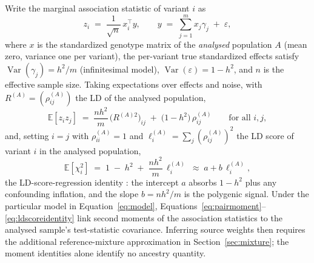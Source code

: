 \documentclass[11pt,a4paper]{article}
\newcommand{\Rho}{\rho}
\begin{document}
Write the marginal association statistic of variant $i$ as
\begin{equation}\label{eq:model}
  z_i \;=\; \frac{1}{\sqrt{n}}\, x_i^{\!\top} y,
  \qquad
  y \;=\; \sum_{j=1}^{m} x_j \gamma_j \;+\; \varepsilon,
\end{equation}
where $x$ is the standardized genotype matrix of the \emph{analysed}
population $A$ (mean zero, variance one per variant), the per-variant true
standardized effects satisfy $\operatorname{Var}(\gamma_j) = h^2/m$
(infinitesimal model), $\operatorname{Var}(\varepsilon) = 1 - h^2$, and $n$
is the effective sample size. Taking expectations over effects and noise,
with $R^{(A)} = (\Rho^{(A)}_{ij})$ the LD of the analysed population,
\begin{equation}\label{eq:pairmoment}
  \mathbb{E}\!\left[ z_i z_j \right]
  \;=\;
  \frac{n h^2}{m} \, \bigl( R^{(A)2} \bigr)_{ij}
  \;+\;
  \bigl( 1 - h^2 \bigr)\, \Rho^{(A)}_{ij}
  \qquad \text{for all } i, j,
\end{equation}
and, setting $i = j$ with $\Rho^{(A)}_{ii} = 1$ and
$\ell^{(A)}_i = \sum_j (\Rho^{(A)}_{ij})^2$ the LD score of variant $i$ in
the analysed population,
\begin{equation}\label{eq:ldscoreidentity}
  \mathbb{E}\!\left[ \chi^2_i \right]
  \;=\;
  1 \;-\; h^2 \;+\; \frac{n h^2}{m}\, \ell^{(A)}_i
  \;\approx\; a + b\, \ell^{(A)}_i ,
\end{equation}
the LD-score-regression identity \citep{bulik2015ldsc}: the intercept $a$
absorbs $1 - h^2$ plus any confounding inflation, and the slope
$b = n h^2 / m$ is the polygenic signal. Under the particular model in
Equation~\eqref{eq:model}, Equations~\eqref{eq:pairmoment}--
\eqref{eq:ldscoreidentity} link second moments of the association statistics
to the analysed sample's test-statistic covariance. Inferring source weights
then requires the additional reference-mixture approximation in
Section~\ref{sec:mixture}; the moment identities alone identify no ancestry
quantity.
\end{document}
